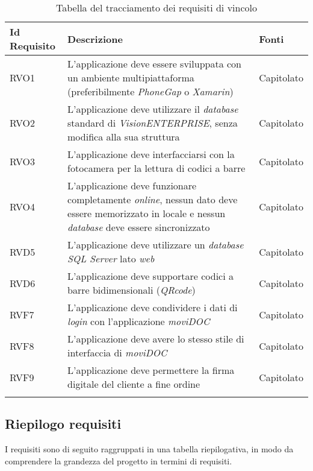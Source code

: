 {\renewcommand{\arraystretch}{2}
\begin{center}
\begin{longtable}{ | >{\centering\arraybackslash}p{2.5cm} | >{\arraybackslash}p{7cm} | >{\centering\arraybackslash}p{2cm} | }
\hline
\textbf{Id Requisito} & \textbf{Descrizione} & \textbf{Fonti} \\ \hline
\endhead
RVO1 & L'applicazione deve essere sviluppata con un ambiente multipiattaforma (preferibilmente \textit{PhoneGap} o \textit{Xamarin}) & Capitolato \\ \hline
RVO2 & L'applicazione deve utilizzare il \textit{database} standard di \textit{VisionENTERPRISE}, senza modifica alla sua struttura & Capitolato \\ \hline
RVO3 & L'applicazione deve interfacciarsi con la fotocamera per la lettura di codici a barre & Capitolato \\ \hline
RVO4 & L'applicazione deve funzionare completamente \textit{online}, nessun dato deve essere memorizzato in locale e nessun \textit{database} deve essere sincronizzato & Capitolato \\ \hline
RVD5 & L'applicazione deve utilizzare un \textit{database} \textit{SQL Server} lato \textit{web} & Capitolato \\ \hline
RVD6 & L'applicazione deve supportare codici a barre bidimensionali (\textit{QRcode}) & Capitolato \\ \hline
RVF7 & L'applicazione deve condividere i dati di \textit{login} con l'applicazione \textit{moviDOC} & Capitolato \\ \hline
RVF8 & L'applicazione deve avere lo stesso stile di interfaccia di \textit{moviDOC} & Capitolato \\ \hline
RVF9 & L'applicazione deve permettere la firma digitale del cliente a fine ordine & Capitolato \\ \hline
\caption{Tabella del tracciamento dei requisiti di vincolo}
\end{longtable}
\end{center}}

\newpage

\subsection{Riepilogo requisiti}

I requisiti sono di seguito raggruppati in una tabella riepilogativa, in modo da comprendere la grandezza del progetto in termini di requisiti.

